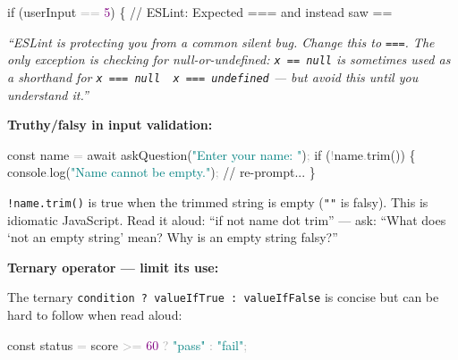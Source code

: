 \documentclass[
  justified,
  openright,
]{tufte-book}
\newcommand{\BuiltInTok}[1]{#1}
\newcommand{\CommentTok}[1]{\textcolor{MidGray}{#1}}
\newcommand{\ControlFlowTok}[1]{\textcolor{BrandBlue}{#1}}
\newcommand{\DecValTok}[1]{\textcolor{Purple}{#1}}
\newcommand{\FunctionTok}[1]{\textcolor{BrandBlue}{#1}}
\newcommand{\KeywordTok}[1]{\textcolor{BrandBlue}{#1}}
\newcommand{\NormalTok}[1]{#1}
\newcommand{\OperatorTok}[1]{\textcolor{DarkGray}{#1}}
\newcommand{\StringTok}[1]{\textcolor{Teal}{#1}}
\newenvironment{Shaded}{%
  \begin{snugshade}
}{%
  \end{snugshade}
}
\begin{document}
\begin{Shaded}
\begin{Highlighting}[]
\ControlFlowTok{if}\NormalTok{ (userInput }\OperatorTok{==} \DecValTok{5}\NormalTok{) \{   }\CommentTok{// ESLint: Expected \textquotesingle{}===\textquotesingle{} and instead saw \textquotesingle{}==\textquotesingle{}}
\end{Highlighting}
\end{Shaded}

\emph{``ESLint is protecting you from a common silent bug. Change this
to \texttt{===}. The only exception is checking for null-or-undefined:
\texttt{x\ ==\ null} is sometimes used as a shorthand for
\texttt{x\ ===\ null\ \textbar{}\textbar{}\ x\ ===\ undefined} --- but
avoid this until you understand it.''}

\textbf{Truthy/falsy in input validation:}

\begin{Shaded}
\begin{Highlighting}[]
\KeywordTok{const}\NormalTok{ name }\OperatorTok{=} \ControlFlowTok{await} \FunctionTok{askQuestion}\NormalTok{(}\StringTok{"Enter your name: "}\NormalTok{)}\OperatorTok{;}
\ControlFlowTok{if}\NormalTok{ (}\OperatorTok{!}\NormalTok{name}\OperatorTok{.}\FunctionTok{trim}\NormalTok{()) \{}
  \BuiltInTok{console}\OperatorTok{.}\FunctionTok{log}\NormalTok{(}\StringTok{"Name cannot be empty."}\NormalTok{)}\OperatorTok{;}
  \CommentTok{// re{-}prompt...}
\NormalTok{\}}
\end{Highlighting}
\end{Shaded}

\texttt{!name.trim()} is true when the trimmed string is empty
(\texttt{""} is falsy). This is idiomatic JavaScript. Read it aloud:
``if not name dot trim'' --- ask: ``What does `not an empty string'
mean? Why is an empty string falsy?''

\textbf{Ternary operator --- limit its use:}

The ternary \texttt{condition\ ?\ valueIfTrue\ :\ valueIfFalse} is
concise but can be hard to follow when read aloud:

\begin{Shaded}
\begin{Highlighting}[]
\KeywordTok{const}\NormalTok{ status }\OperatorTok{=}\NormalTok{ score }\OperatorTok{\textgreater{}=} \DecValTok{60} \OperatorTok{?} \StringTok{"pass"} \OperatorTok{:} \StringTok{"fail"}\OperatorTok{;}
\end{Highlighting}
\end{Shaded}
\end{document}
